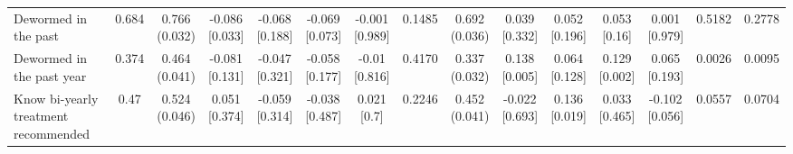 {\begin{tabular}[t]{lcccccccccccccc}
\hspace{1em}Dewormed in the past & 0.684 & \makecell[c]{0.766\\(0.032)} & \makecell[c]{-0.086\\{[0.033]}} & \makecell[c]{-0.068\\{[0.188]}} & \makecell[c]{-0.069\\{[0.073]}} & \makecell[c]{-0.001\\{[0.989]}} & 0.1485 & \makecell[c]{0.692\\(0.036)} & \makecell[c]{0.039\\{[0.332]}} & \makecell[c]{0.052\\{[0.196]}} & \makecell[c]{0.053\\{[0.16]}} & \makecell[c]{0.001\\{[0.979]}} & 0.5182 & 0.2778\\
\hspace{1em}Dewormed in the past year & 0.374 & \makecell[c]{0.464\\(0.041)} & \makecell[c]{-0.081\\{[0.131]}} & \makecell[c]{-0.047\\{[0.321]}} & \makecell[c]{-0.058\\{[0.177]}} & \makecell[c]{-0.01\\{[0.816]}} & 0.4170 & \makecell[c]{0.337\\(0.032)} & \makecell[c]{0.138\\{[0.005]}} & \makecell[c]{0.064\\{[0.128]}} & \makecell[c]{0.129\\{[0.002]}} & \makecell[c]{0.065\\{[0.193]}} & 0.0026 & 0.0095\\
\hspace{1em}Know bi-yearly treatment recommended & 0.47 & \makecell[c]{0.524\\(0.046)} & \makecell[c]{0.051\\{[0.374]}} & \makecell[c]{-0.059\\{[0.314]}} & \makecell[c]{-0.038\\{[0.487]}} & \makecell[c]{0.021\\{[0.7]}} & 0.2246 & \makecell[c]{0.452\\(0.041)} & \makecell[c]{-0.022\\{[0.693]}} & \makecell[c]{0.136\\{[0.019]}} & \makecell[c]{0.033\\{[0.465]}} & \makecell[c]{-0.102\\{[0.056]}} & 0.0557 & 0.0704\\

\end{tabular}}
